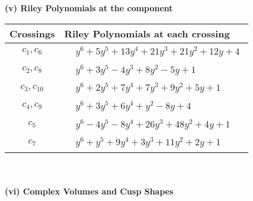 \documentclass[1p]{elsarticle_modified}
\theoremstyle{definition}
\begin{document}
\newpage\renewcommand{\arraystretch}{1}
\flushleft \textbf{(v) Riley Polynomials at the component}\newline \\
\begin{tabular}{m{50pt}|m{274pt}}
Crossings & \hspace{64pt}Riley Polynomials at each crossing \\
\hline $$\begin{aligned}c_{1},c_{6}\end{aligned}$$&$\begin{aligned}
&y^6+5 y^5+13 y^4+21 y^3+21 y^2+12 y+4
\end{aligned}$\\
\hline $$\begin{aligned}c_{2},c_{8}\end{aligned}$$&$\begin{aligned}
&y^6+3 y^5-4 y^3+8 y^2-5 y+1
\end{aligned}$\\
\hline $$\begin{aligned}c_{3},c_{10}\end{aligned}$$&$\begin{aligned}
&y^6+2 y^5+7 y^4+7 y^3+9 y^2+5 y+1
\end{aligned}$\\
\hline $$\begin{aligned}c_{4},c_{9}\end{aligned}$$&$\begin{aligned}
&y^6+3 y^5+6 y^4+y^2-8 y+4
\end{aligned}$\\
\hline $$\begin{aligned}c_{5}\end{aligned}$$&$\begin{aligned}
&y^6-4 y^5-8 y^4+26 y^3+48 y^2+4 y+1
\end{aligned}$\\
\hline $$\begin{aligned}c_{7}\end{aligned}$$&$\begin{aligned}
&y^6+y^5+9 y^4+3 y^3+11 y^2+2 y+1
\end{aligned}$\\
\hline
\end{tabular}\\~\\
\newpage\flushleft \textbf{(vi) Complex Volumes and Cusp Shapes}
\end{document}
